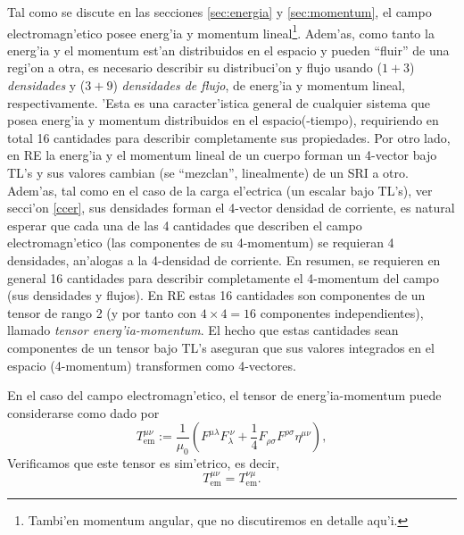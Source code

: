 Tal como se discute en las secciones \ref{sec:energia} y \ref{sec:momentum}, el campo electromagn'etico posee energ'ia y momentum lineal\footnote{Tambi'en momentum angular, que no discutiremos en detalle aqu'i.}. Adem'as, como tanto la energ'ia y el momentum est'an distribuidos en el espacio y pueden ``fluir'' de una regi'on a otra, es necesario describir su distribuci'on y flujo usando ($1+3$) \textit{densidades}  y ($3+9$) \textit{densidades de flujo}, de energ'ia y momentum lineal, respectivamente. 'Esta es una caracter'istica general de cualquier sistema que posea energ'ia y momentum distribuidos en el espacio(-tiempo), requiriendo en total 16 cantidades para describir completamente sus propiedades. Por otro lado, en RE la energ'ia y el momentum lineal de un cuerpo forman un 4-vector bajo TL's y sus valores cambian (se ``mezclan'', linealmente) de un SRI a otro. Adem'as, tal como en el caso de la carga el'ectrica (un escalar bajo TL's), ver secci'on \ref{ccer}, sus densidades forman el 4-vector densidad de corriente, es natural esperar que cada una de las 4 cantidades que describen el campo electromagn'etico (las componentes de su 4-momentum) se requieran 4 densidades, an'alogas a la 4-densidad de corriente. En resumen, se requieren en general 16 cantidades para describir completamente el 4-momentum del campo (sus densidades y flujos). En RE estas 16 cantidades son componentes de un tensor de rango 2 (y por tanto con $4\times 4=16$ componentes independientes), llamado \textit{tensor energ'ia-momentum}. El hecho que estas cantidades sean componentes de un tensor bajo TL's aseguran que sus valores integrados en el espacio (4-momentum) transformen como 4-vectores. 

En el caso del campo electromagn'etico, el tensor de energ'ia-momentum puede considerarse como dado por
\begin{equation}
\boxed{T_\text{em}^{\mu\nu}:=\frac{1}{\mu_0}\left(  F^{\mu\lambda}F_\lambda^{\ \nu}+\frac{1}{4}F_{\rho\sigma}F^{\rho\sigma}\eta^{\mu\nu} \right),}  \label{temsimSI}
\end{equation}
Verificamos que este tensor es sim'etrico, es decir, 
\begin{equation}
T_\text{em}^{\mu\nu}=T_\text{em}^{\nu\mu}.
\end{equation}


